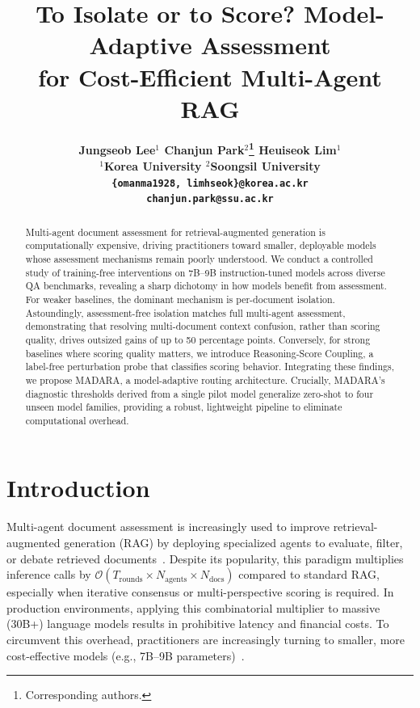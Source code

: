\documentclass[11pt]{article}
\title{To Isolate or to Score? Model-Adaptive Assessment \\ for Cost-Efficient Multi-Agent RAG}
\author{
  \bfseries Jungseob Lee$^{1}$ \quad
  Chanjun Park$^{2}$\thanks{Corresponding authors.} \quad
  Heuiseok Lim$^{1}$\footnotemark[1] \\
  $^{1}$Korea University \quad $^{2}$Soongsil University \\
  \texttt{\{omanma1928, limhseok\}@korea.ac.kr} \\
  \texttt{chanjun.park@ssu.ac.kr}
}
\theoremstyle{definition}
\begin{document}
\maketitle
\begin{abstract}
Multi-agent document assessment for retrieval-augmented generation is computationally expensive, driving practitioners toward smaller, deployable models whose assessment mechanisms remain poorly understood. We conduct a controlled study of training-free interventions on 7B--9B instruction-tuned models across diverse QA benchmarks, revealing a sharp dichotomy in how models benefit from assessment. For weaker baselines, the dominant mechanism is per-document isolation. Astoundingly, assessment-free isolation matches full multi-agent assessment, demonstrating that resolving multi-document context confusion, rather than scoring quality, drives outsized gains of up to 50 percentage points. Conversely, for strong baselines where scoring quality matters, we introduce Reasoning-Score Coupling, a label-free perturbation probe that classifies scoring behavior. Integrating these findings, we propose MADARA, a model-adaptive routing architecture. Crucially, MADARA's diagnostic thresholds derived from a single pilot model generalize zero-shot to four unseen model families, providing a robust, lightweight pipeline to eliminate computational overhead.
\end{abstract}





\section{Introduction}
\label{sec:intro}

Multi-agent document assessment is increasingly used to improve retrieval-augmented generation (RAG) by deploying specialized agents to evaluate, filter, or debate retrieved documents~\citep{lewis2020retrieval, chang2025main, wang2025retrieval, hu2025removal}. Despite its popularity, this paradigm multiplies inference calls by \(\mathcal{O}(T_{\text{rounds}} \times N_{\text{agents}} \times N_{\text{docs}})\) compared to standard RAG, especially when iterative consensus or multi-perspective scoring is required. In production environments, applying this combinatorial multiplier to massive (30B+) language models results in prohibitive latency and financial costs. To circumvent this overhead, practitioners are increasingly turning to smaller, more cost-effective models (e.g., 7B--9B parameters)~\cite{wang2025comprehensive, lu2024small, cai2026efficient, prieto2025edge}.
\end{document}
